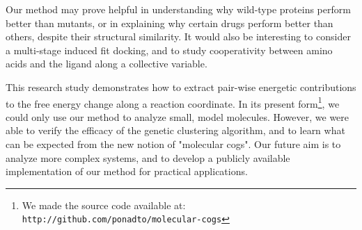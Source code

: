 Our method may prove helpful in understanding why wild-type proteins perform better than mutants, or in explaining why certain drugs perform better than others, despite their structural similarity.
It would also be interesting to consider a multi-stage induced fit docking, and to study cooperativity between amino acids and the ligand along a collective variable.

This research study demonstrates how to extract pair-wise energetic contributions to the free energy change along a reaction coordinate.
In its present form\footnote{We made the source code available at: \texttt{http://github.com/ponadto/molecular-cogs}}, we could only use our method to analyze small, {\color{black}model} molecules.
However, {\color{black}we were able} to verify the efficacy of the genetic clustering algorithm, and to learn what can be expected from the new notion of "molecular cogs".
Our future aim is to analyze more complex systems, and to develop a publicly available implementation of our method for practical applications.

% 

